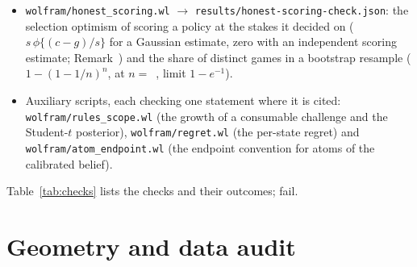 \documentclass[aoas]{imsart}
\theoremstyle{plain}
\theoremstyle{definition}
\newcommand{\Prob}{\mathbb{P}}
\begin{document}
\begin{itemize}
Section~ -- the behavioural signal $s_p+\sqrt{1-\rho}\,\sigma_r\varepsilon_2$ has noise exactly
$N(0,\sigma_r^2)$ for every $\rho$ (Proposition~(d)), so $\partial\Prob(\text{challenge}\mid w)/\partial\rho=0$,
and the value of the calibrated one-opportunity cutoff decision falls with the signal noise on a grid of priors,
stakes and continuation values.
\item \nolinkurl{wolfram/honest_scoring.wl} $\to$ \nolinkurl{results/honest-scoring-check.json}: the selection
optimism of scoring a policy at the stakes it decided on ($s\,\phi\{(c-g)/s\}$ for a Gaussian estimate, zero with an
independent scoring estimate; Remark~) and the share of distinct games in a bootstrap resample
($1-(1-1/n)^n$, \SDistinctShare{} at $n=$~\NGamesABS{}, limit $1-e^{-1}$).
\item Auxiliary scripts, each checking one statement where it is cited: \nolinkurl{wolfram/rules_scope.wl} (the growth of a
consumable challenge and the Student-$t$ posterior), \nolinkurl{wolfram/regret.wl} (the per-state regret) and
\nolinkurl{wolfram/atom_endpoint.wl} (the endpoint convention for atoms of the calibrated belief).
\end{itemize}
Table~\ref{tab:checks} lists the \SNChecks{} checks and their outcomes; \SChecksFailed{} fail.

\begin{table}[!htbp]
\caption{Symbolic checks. ``True'': Mathematica returned \texttt{True} for an identity or a quantified inequality.
``Max.\ error'': the largest absolute difference between a closed form and direct high-precision integration, or
between the value computed in Python and the exact one.}\label{tab:checks}
\centering\scriptsize

\end{table}

\section{Geometry and data audit}\label{sec:geometry}
\end{document}
